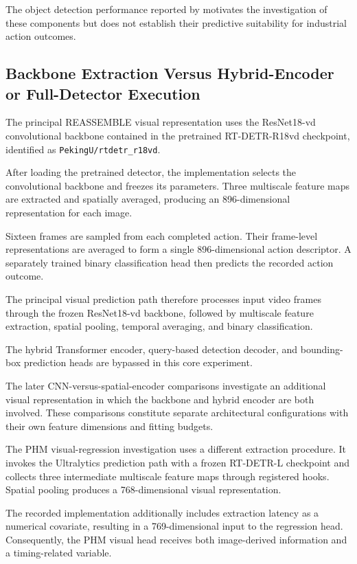 The object detection performance reported by \textcite{Zhao2024RTDETR} motivates the investigation of these components but does not establish their predictive suitability for industrial action outcomes.

\subsection{Backbone Extraction Versus Hybrid-Encoder or Full-Detector Execution}

The principal REASSEMBLE visual representation uses the ResNet18-vd convolutional backbone contained in the pretrained RT-DETR-R18vd checkpoint, identified as \nolinkurl{PekingU/rtdetr_r18vd}.

After loading the pretrained detector, the implementation selects the convolutional backbone and freezes its parameters. Three multiscale feature maps are extracted and spatially averaged, producing an 896-dimensional representation for each image.

Sixteen frames are sampled from each completed action. Their frame-level representations are averaged to form a single 896-dimensional action descriptor. A separately trained binary classification head then predicts the recorded action outcome.

The principal visual prediction path therefore processes input video frames through the frozen ResNet18-vd backbone, followed by multiscale feature extraction, spatial pooling, temporal averaging, and binary classification.

The hybrid Transformer encoder, query-based detection decoder, and bounding-box prediction heads are bypassed in this core experiment.

The later CNN-versus-spatial-encoder comparisons investigate an additional visual representation in which the backbone and hybrid encoder are both involved. These comparisons constitute separate architectural configurations with their own feature dimensions and fitting budgets.

The PHM visual-regression investigation uses a different extraction procedure. It invokes the Ultralytics prediction path with a frozen RT-DETR-L checkpoint and collects three intermediate multiscale feature maps through registered hooks. Spatial pooling produces a 768-dimensional visual representation.

The recorded implementation additionally includes extraction latency as a numerical covariate, resulting in a 769-dimensional input to the regression head. Consequently, the PHM visual head receives both image-derived information and a timing-related variable.

